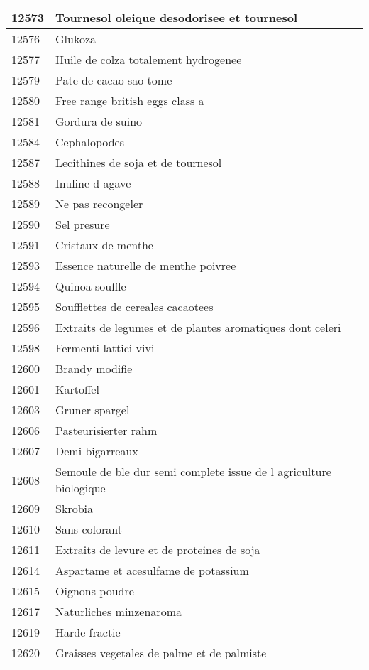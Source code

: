 \begin{longtable}{|l|l|}
12573 & Tournesol oleique desodorisee et tournesol \\ \hline 
12576 & Glukoza \\ \hline 
12577 & Huile de colza totalement hydrogenee \\ \hline 
12579 & Pate de cacao sao tome \\ \hline 
12580 & Free range british eggs class a \\ \hline 
12581 & Gordura de suino \\ \hline 
12584 & Cephalopodes \\ \hline 
12587 & Lecithines de soja et de tournesol \\ \hline 
12588 & Inuline d agave \\ \hline 
12589 & Ne pas recongeler \\ \hline 
12590 & Sel presure \\ \hline 
12591 & Cristaux de menthe \\ \hline 
12593 & Essence naturelle de menthe poivree \\ \hline 
12594 & Quinoa souffle \\ \hline 
12595 & Soufflettes de cereales cacaotees \\ \hline 
12596 & Extraits de legumes et de plantes aromatiques dont celeri \\ \hline 
12598 & Fermenti lattici vivi \\ \hline 
12600 & Brandy modifie \\ \hline 
12601 & Kartoffel \\ \hline 
12603 & Gruner spargel \\ \hline 
12606 & Pasteurisierter rahm \\ \hline 
12607 & Demi bigarreaux \\ \hline 
12608 & Semoule de ble dur semi complete issue de l agriculture biologique \\ \hline 
12609 & Skrobia \\ \hline 
12610 & Sans colorant \\ \hline 
12611 & Extraits de levure et de proteines de soja \\ \hline 
12614 & Aspartame et acesulfame de potassium \\ \hline 
12615 & Oignons poudre \\ \hline 
12617 & Naturliches minzenaroma \\ \hline 
12619 & Harde fractie \\ \hline 
12620 & Graisses vegetales de palme et de palmiste \\ \hline 

\end{longtable}
